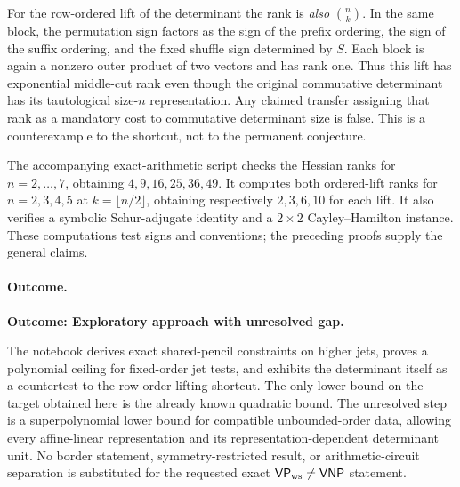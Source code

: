 \documentclass[11pt,a4paper]{article}
\numberwithin{equation}{section}
\begin{document}
For the row-ordered lift of the determinant the rank is \emph{also} $\binom nk$. In the same block, the permutation sign factors as the sign of the prefix ordering, the sign of the suffix ordering, and the fixed shuffle sign determined by $S$. Each block is again a nonzero outer product of two vectors and has rank one. Thus this lift has exponential middle-cut rank even though the original commutative determinant has its tautological size-$n$ representation. Any claimed transfer assigning that rank as a mandatory cost to commutative determinant size is false. This is a counterexample to the shortcut, not to the permanent conjecture.

The accompanying exact-arithmetic script checks the Hessian ranks for $n=2,\ldots,7$, obtaining $4,9,16,25,36,49$. It computes both ordered-lift ranks for $n=2,3,4,5$ at $k=\lfloor n/2\rfloor$, obtaining respectively $2,3,6,10$ for each lift. It also verifies a symbolic Schur-adjugate identity and a $2\times2$ Cayley--Hamilton instance. These computations test signs and conventions; the preceding proofs supply the general claims.

\paragraph{Outcome.}
\textbf{Outcome: Exploratory approach with unresolved gap.}

The notebook derives exact shared-pencil constraints on higher jets, proves a polynomial ceiling for fixed-order jet tests, and exhibits the determinant itself as a countertest to the row-order lifting shortcut. The only lower bound on the target obtained here is the already known quadratic bound. The unresolved step is a superpolynomial lower bound for compatible unbounded-order data, allowing every affine-linear representation and its representation-dependent determinant unit. No border statement, symmetry-restricted result, or arithmetic-circuit separation is substituted for the requested exact $\mathsf{VP}_{\rm ws}\ne\mathsf{VNP}$ statement.
\end{document}
